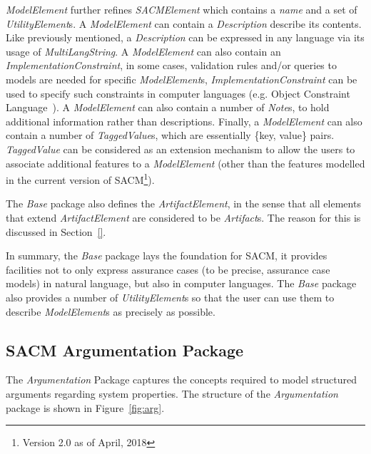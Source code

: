 \textit{ModelElement} further refines \textit{SACMElement} which contains a \textit{name} and a set of \textit{UtilityElement}s. A \textit{ModelElement} can contain a \textit{Description} describe its contents. Like previously mentioned, a \textit{Description} can be expressed in any language via its usage of \textit{MultiLangString}. A \textit{ModelElement} can also contain an \textit{ImplementationConstraint}, in some cases, validation rules and/or queries to models are needed for specific \textit{ModelElement}s, \textit{ImplementationConstraint} can be used to specify such constraints in computer languages (e.g. Object Constraint Language~\cite{}). A \textit{ModelElement} can also contain a number of \textit{Note}s, to hold additional information rather than descriptions. Finally, a \textit{ModelElement} can also contain a number of \textit{TaggedValue}s, which are essentially \{key, value\} pairs. \textit{TaggedValue} can be considered as an extension mechanism to allow the users to associate additional features to a \textit{ModelElement} (other than the features modelled in the current version of SACM\footnote{Version 2.0 as of April, 2018}).

The \textit{Base} package also defines the \textit{ArtifactElement}, in the sense that all elements that extend \textit{ArtifactElement} are considered to be \textit{Artifact}s. The reason for this is discussed in Section~\ref{}. 

In summary, the \textit{Base} package lays the foundation for SACM, it provides facilities not to only express assurance cases (to be precise, assurance case models) in natural language, but also in computer languages. The \textit{Base} package also provides a number of \textit{UtilityElement}s so that the user can use them to describe \textit{ModelElement}s as precisely as possible.

\subsection{SACM Argumentation Package}
\label{sec:argPack}
The \textit{Argumentation} Package captures the concepts required to model structured arguments regarding system properties. The structure of the \textit{Argumentation} package is shown in Figure~\ref{fig:arg}. 

